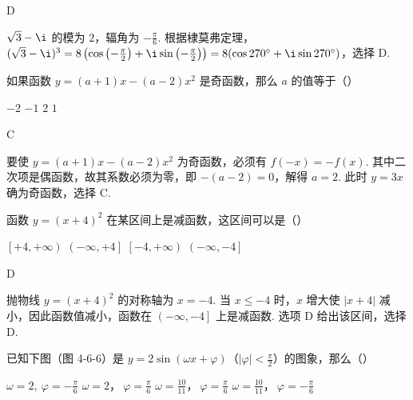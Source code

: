 \begin{answer}
D
\end{answer}

\begin{solution}
\(\sqrt3-\i\) 的模为 \(2\)，辐角为 \(-\frac{\pi}{6}\). 根据棣莫弗定理，\((\sqrt3-\i)^3=8\left(\cos\left(-\frac{\pi}{2}\right)+\i\sin\left(-\frac{\pi}{2}\right)\right)=8(\cos270^{\circ}+\i\sin270^{\circ})\)，选择 D.
\end{solution}

\begin{problem}
如果函数 \(y=(a+1)x-(a-2)x^2\) 是奇函数，那么 \(a\) 的值等于（\quad）

\choices
    {\(-2\)}
    {\(-1\)}
    {\(2\)}
    {\(1\)}
\end{problem}

\begin{answer}
C
\end{answer}

\begin{solution}
要使 \(y=(a+1)x-(a-2)x^2\) 为奇函数，必须有 \(f(-x)=-f(x)\). 其中二次项是偶函数，故其系数必须为零，即 \(-(a-2)=0\)，解得 \(a=2\). 此时 \(y=3x\) 确为奇函数，选择 C.
\end{solution}

\begin{problem}
函数 \(y=(x+4)^2\) 在某区间上是减函数，这区间可以是（\quad）

\choices
    {\(\left[+4,+\infty\right)\)}
    {\(\left(-\infty,+4\right]\)}
    {\(\left[-4,+\infty\right)\)}
    {\(\left(-\infty,-4\right]\)}
\end{problem}

\begin{answer}
D
\end{answer}

\begin{solution}
抛物线 \(y=(x+4)^2\) 的对称轴为 \(x=-4\). 当 \(x\leqslant-4\) 时，\(x\) 增大使 \(|x+4|\) 减小，因此函数值减小，函数在 \(\left(-\infty,-4\right]\) 上是减函数. 选项 D 给出该区间，选择 D.
\end{solution}

\begin{problem}
已知下图（图 4-6-6）是 \(y=2\sin(\omega x+\varphi)\)（\(\left|\varphi\right|<\frac{\pi}{2}\)）的图象，那么（\quad）


\choices
    {\(\omega=2,\ \varphi=-\frac{\pi}{6}\)}
    {\(\omega=2\)，\(\ \varphi=\frac{\pi}{6}\)}
    {\(\omega=\frac{10}{11}\)，\(\ \varphi=\frac{\pi}{6}\)}
    {\(\omega=\frac{10}{11}\)，\(\ \varphi=-\frac{\pi}{6}\)}
\end{problem}


